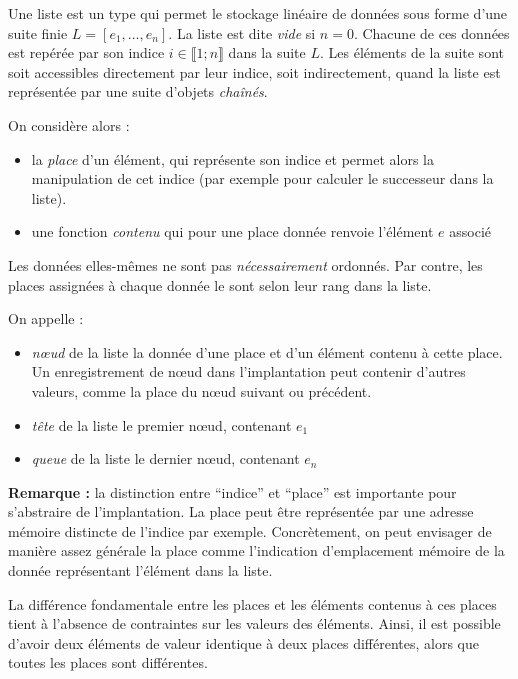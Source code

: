 \documentclass[../../../main.tex]{subfiles}
\begin{document}
Une liste est un type qui permet le stockage linéaire de données sous forme d'une suite finie $L = [e_1, \dots, e_n]$. La liste est dite \textit{vide} si $n = 0$. Chacune de ces données est repérée par son indice $i\in\llbracket 1;n \rrbracket$ dans la suite $L$. Les éléments de la suite sont soit accessibles directement par leur indice, soit indirectement, quand la liste est représentée par une suite d'objets \textit{chaînés}.

On considère alors :
\begin{itemize}
	\item la \textit{place} d'un élément, qui représente son indice et permet alors la manipulation de cet indice (par exemple pour calculer le successeur dans la liste).
	\item une fonction \textit{contenu} qui pour une place donnée renvoie l'élément $e$ associé
\end{itemize}
Les données elles-mêmes ne sont pas \textit{nécessairement} ordonnés. Par contre, les places assignées à chaque donnée le sont selon leur rang dans la liste.

On appelle :
\begin{itemize}
	\item \textit{n\oe{}ud} de la liste la donnée d'une place et d'un élément contenu à cette place. Un enregistrement de n\oe{}ud dans l'implantation peut contenir d'autres valeurs, comme la place du n\oe{}ud suivant ou précédent.
	\item \textit{tête} de la liste le premier n\oe{}ud, contenant $e_1$
	\item \textit{queue} de la liste le dernier n\oe{}ud, contenant $e_n$
\end{itemize}
\textbf{Remarque :} la distinction entre ``indice'' et ``place'' est importante pour s'abstraire de l'implantation. La place peut être représentée par une adresse mémoire distincte de l'indice par exemple. Concrètement, on peut envisager de manière assez générale la place comme l'indication d'emplacement mémoire de la donnée représentant l'élément dans la liste.

\begin{minipage}{\textwidth}
	\begin{center}
		
	\end{center}
\end{minipage}

La différence fondamentale entre les places et les éléments contenus à ces places tient à l'absence de contraintes sur les valeurs des éléments. Ainsi, il est possible d'avoir deux éléments de valeur identique à deux places différentes, alors que toutes les places sont différentes.
\end{document}
